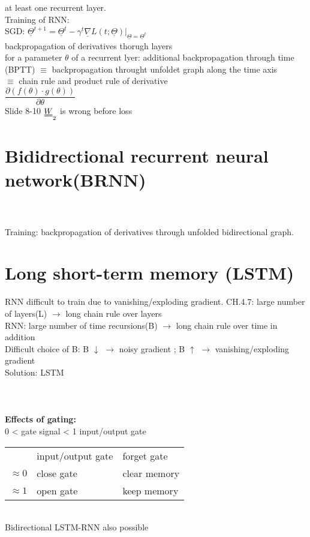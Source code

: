 at least one recurrent layer. \\
Training of RNN:\\
\textbullet SGD: $  \underline{\Theta}^{t+1}   = \underline{\Theta}^{t}  - \gamma ^t \underline{\nabla}L (t ; \underline{\Theta} ) | _{\underline{\Theta}^{} = \underline{\Theta}^{t}  } $\\
\textbullet backpropagation of derivatives thorugh layers \\
\textbullet for a parameter $  \theta  $ of a recurrent lyer: additional backpropagation through time (BPTT) $  \equiv  $ backpropagation throught unfoldet graph along the time axis \\
$  \equiv $ chain rule and product rule of derivative \\
$  \dfrac{\partial (f (\theta ) \cdot g (\theta))}{\partial \theta } $\\
\textbullet Slide 8-10 $  \W_2 $ is wrong before loss
\section{Bididrectional recurrent neural network(BRNN)}
 \\
 \\
Training: backpropagation of derivatives through unfolded bidirectional graph. 
\section{Long short-term memory (LSTM)}
RNN difficult to train due to vanishing/exploding gradient. CH.4.7: large number of layers(L) $ \rightarrow $ long chain rule over layers \\
RNN: large number of time recursions(B) $ \rightarrow $ long chain rule over time in addition\\
Difficult choice of B: B $ \downarrow $ $ \rightarrow $ noisy gradient ; B $  \uparrow $ $ \rightarrow $ vanishing/exploding gradient\\
Solution: LSTM\\
\\
\\
   \\
\textbf{Effects of gating:}\\
0 < gate signal < 1 input/output gate \\
\begin{tabular}{lll}
	& input/output gate & forget gate \\
	$ \approx 0  $& close gate & clear memory \\
	$ \approx 1  $& open gate & keep memory 
\end{tabular}\\
Bidirectional LSTM-RNN also possible\\










